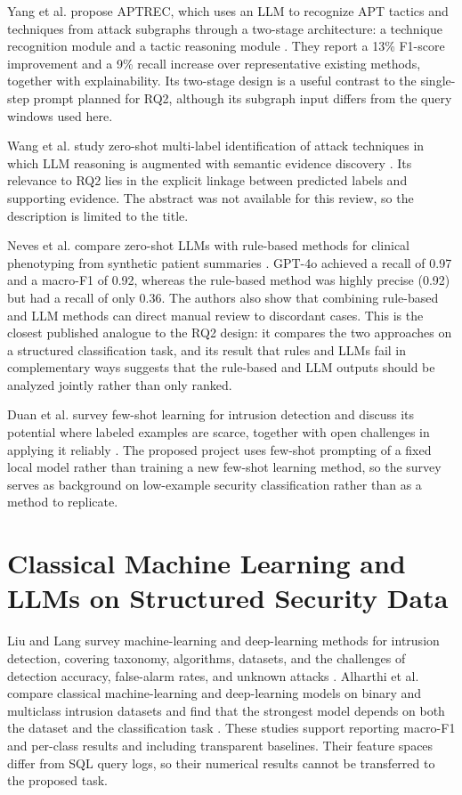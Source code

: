 \documentclass[12pt,a4paper]{report}
\begin{document}
Yang et al. propose APTREC, which uses an LLM to recognize APT tactics and techniques from attack subgraphs through a two-stage architecture: a technique recognition module and a tactic reasoning module \cite{yang_aptrec_2026}. They report a 13\% F1-score improvement and a 9\% recall increase over representative existing methods, together with explainability. Its two-stage design is a useful contrast to the single-step prompt planned for RQ2, although its subgraph input differs from the query windows used here.

Wang et al. study zero-shot multi-label identification of attack techniques in which LLM reasoning is augmented with semantic evidence discovery \cite{wang_toward_2026}. Its relevance to RQ2 lies in the explicit linkage between predicted labels and supporting evidence. The abstract was not available for this review, so the description is limited to the title.

Neves et al. compare zero-shot LLMs with rule-based methods for clinical phenotyping from synthetic patient summaries \cite{neves_zero-shot_2025}. GPT-4o achieved a recall of 0.97 and a macro-F1 of 0.92, whereas the rule-based method was highly precise (0.92) but had a recall of only 0.36. The authors also show that combining rule-based and LLM methods can direct manual review to discordant cases. This is the closest published analogue to the RQ2 design: it compares the two approaches on a structured classification task, and its result that rules and LLMs fail in complementary ways suggests that the rule-based and LLM outputs should be analyzed jointly rather than only ranked.

Duan et al. survey few-shot learning for intrusion detection and discuss its potential where labeled examples are scarce, together with open challenges in applying it reliably \cite{duan_survey_2021}. The proposed project uses few-shot prompting of a fixed local model rather than training a new few-shot learning method, so the survey serves as background on low-example security classification rather than as a method to replicate.

\section{Classical Machine Learning and LLMs on Structured Security Data}
Liu and Lang survey machine-learning and deep-learning methods for intrusion detection, covering taxonomy, algorithms, datasets, and the challenges of detection accuracy, false-alarm rates, and unknown attacks \cite{liu_machine_2019}. Alharthi et al. compare classical machine-learning and deep-learning models on binary and multiclass intrusion datasets and find that the strongest model depends on both the dataset and the classification task \cite{alharthi_comparative_2025}. These studies support reporting macro-F1 and per-class results and including transparent baselines. Their feature spaces differ from SQL query logs, so their numerical results cannot be transferred to the proposed task.
\end{document}
